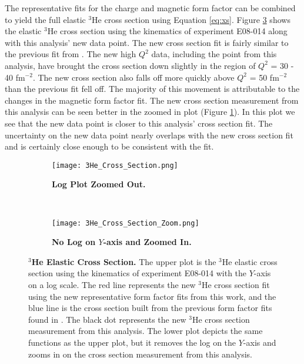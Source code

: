 The representative fits for the charge and magnetic form factor can be combined to yield the full elastic $^3$He cross section using Equation \ref{eq:xs}. Figure \ref{fig:3he_cross_section} shows the elastic $^3$He cross section using the kinematics of experiment E08-014 along with this analysis' new data point. The new cross section fit is fairly similar to the previous fit from \cite{Article:Amroun}. The new high $Q^2$ data, including the point from this analysis, have brought the cross section down slightly in the region of $Q^2$ = 30 - 40 fm$^{-2}$. The new cross section also falls off more quickly above $Q^2$ = 50 fm$^{-2}$ than the previous fit fell off. The majority of this movement is attributable to the changes in the magnetic form factor fit. The new cross section measurement from this analysis can be seen better in the zoomed in plot (Figure \ref{fig:3he_fch_rep_fit}). In this plot we see that the new data point is closer to this analysis' cross section fit. The uncertainty on the new data point nearly overlaps with the new cross section fit and is certainly close enough to be consistent with the fit.

\begin{figure}[!ht]
\begin{subfigure}{1.\textwidth}
  \centering
  \texttt{[image: 3He\_Cross\_Section.png]}
  \caption{\bf{Log Plot Zoomed Out.}}
  \label{fig:3he_fch_rep_fit}
\end{subfigure}\\
\begin{subfigure}{1.\textwidth}
  \centering
  \texttt{[image: 3He\_Cross\_Section\_Zoom.png]}
  \caption{\bf{No Log on $Y$-axis and Zoomed In.}}
  \label{fig:3he_fm_rep_fit}
\end{subfigure}
\caption[$^3$He Elastic Cross Section] {
{\bf{$^3$He Elastic Cross Section.}} The upper plot is the $^3$He elastic cross section using the kinematics of experiment E08-014 with the $Y$-axis on a log scale. The red line represents the new $^3$He cross section fit using the new representative form factor fits from this work, and the blue line is the cross section built from the previous form factor fits found in \cite{Article:Amroun}. The black dot represents the new $^3$He cross section measurement from this analysis. The lower plot depicts the same functions as the upper plot, but it removes the log on the $Y$-axis and zooms in on the cross section measurement from this analysis.}
\label{fig:3he_cross_section}
\end{figure}

